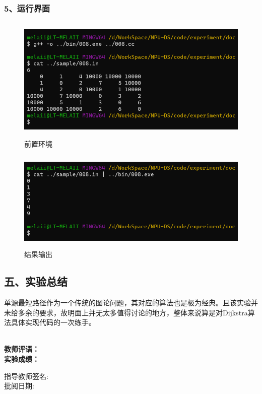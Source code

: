 \documentclass[UTF8, a4paper]{ctexart}
\begin{document}
\subsubsection*{5、运行界面}
\begin{figure}[H]
	\begin{minipage}[t]{\linewidth}
		\centering
		\includegraphics[width=125mm,height=60mm]{./assets/DS08-2}
		\caption{前置环境}
	\end{minipage}
\end{figure}
\begin{figure}[H]
	\begin{minipage}[t]{\linewidth}
		\centering
		\includegraphics[width=125mm,height=48mm]{./assets/DS08-3}
		\caption{结果输出}
	\end{minipage}
\end{figure}

\subsection*{五、实验总结}
单源最短路径作为一个传统的图论问题，其对应的算法也是极为经典。且该实验并未给多余的要求，故明面上并无太多值得讨论的地方，整体来说算是对Dijkstra算法具体实现代码的一次练手。

~\\
\textbf{教师评语：}
~\\
\textbf{实验成绩：}

\begin{flushright}
\mbox{指导教师签名:\qquad\qquad} \\
\mbox{批阅日期:\qquad\qquad}
\end{flushright}
\end{document}
